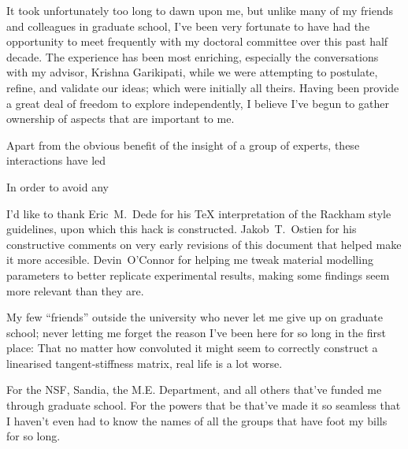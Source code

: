 \startacknowledgementspage
{
  It took unfortunately too long to dawn upon me, but unlike many of
  my friends and colleagues in graduate school, I've been very
  fortunate to have had the opportunity to meet frequently with my
  doctoral committee over this past half decade.
  The experience has been most enriching, especially
  the conversations with my advisor, Krishna Garikipati, while we were
  attempting to postulate, refine, and validate our ideas; which were
  initially all theirs. Having been provide a great deal of freedom
  to explore independently, I believe I've begun to gather ownership
  of aspects that are important to me.

  Apart from the obvious benefit of the insight of a group of experts,
  these interactions have led 

  In order to avoid any 

  I'd like to thank Eric~M.~Dede for his TeX interpretation of the
  Rackham style guidelines, upon which this hack is
  constructed. Jakob~T.~Ostien for his constructive comments on very
  early revisions of this document that helped make it more
  accesible. Devin~O'Connor for helping me tweak material modelling
  parameters to better replicate experimental results, making some
  findings seem more relevant than they are.

  My few ``friends'' outside the university who never let me give up
  on graduate school; never letting me forget the reason I've been
  here for so long in the  first place: That no matter how convoluted it
  might seem to correctly construct a linearised tangent-stiffness
  matrix, real life is a lot worse.

  For the NSF, Sandia, the M.E. Department, and all others that've
  funded me through graduate school. For the powers that be that've
  made it so seamless that I haven't even had to know the names of all
  the groups that have foot my bills for so long.
}

\tableofcontents
\listoffigures
\listoftables
\listofappendices

\let\footnotesize=\small

%

